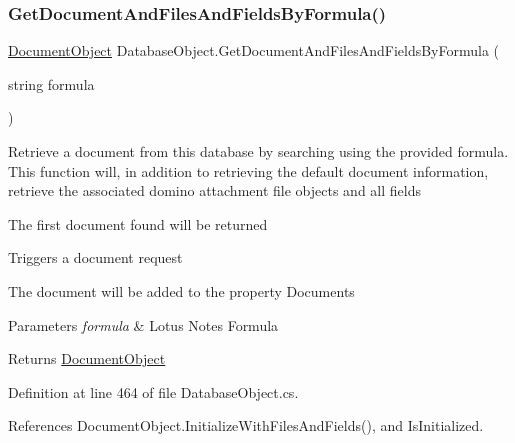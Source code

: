 \subsubsection{\texorpdfstring{Get\+Document\+And\+Files\+And\+Fields\+By\+Formula()}{GetDocumentAndFilesAndFieldsByFormula()}\hspace{0.1cm}{\footnotesize\ttfamily [2/2]}}
{\footnotesize\ttfamily \mbox{\hyperlink{class_document_object}{Document\+Object}} Database\+Object.\+Get\+Document\+And\+Files\+And\+Fields\+By\+Formula (\begin{DoxyParamCaption}\item[{string}]{formula }\end{DoxyParamCaption})}



Retrieve a document from this database by searching using the provided formula. This function will, in addition to retrieving the default document information, retrieve the associated domino attachment file objects and all fields 

The first document found will be returned

Triggers a document request

The document will be added to the property \textquotesingle{}Documents\textquotesingle{}


\begin{DoxyParams}{Parameters}
{\em formula} & Lotus Notes Formula\\
\hline
\end{DoxyParams}
\begin{DoxyReturn}{Returns}
\mbox{\hyperlink{class_document_object}{Document\+Object}}
\end{DoxyReturn}


Definition at line 464 of file Database\+Object.\+cs.



References Document\+Object.\+Initialize\+With\+Files\+And\+Fields(), and Is\+Initialized.


